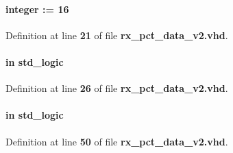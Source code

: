 \paragraph[{ch\+\_\+num}]{ {\bfseries \textcolor{vhdlchar}{ }} {\bfseries \textcolor{comment}{integer}\textcolor{vhdlchar}{ }\textcolor{vhdlchar}{ }\textcolor{vhdlchar}{\+:}\textcolor{vhdlchar}{=}\textcolor{vhdlchar}{ }\textcolor{vhdlchar}{ } \textcolor{vhdldigit}{16} \textcolor{vhdlchar}{ }} \hspace{0.3cm}{\ttfamily [Generic]}}\label{classrx__pct__data__v2_abafab72bb6917998129b758f19755c4c}


Definition at line {\bf 21} of file {\bf rx\+\_\+pct\+\_\+data\+\_\+v2.\+vhd}.

\paragraph[{clk}]{ {\bfseries \textcolor{keywordflow}{in}\textcolor{vhdlchar}{ }} {\bfseries \textcolor{comment}{std\+\_\+logic}\textcolor{vhdlchar}{ }} \hspace{0.3cm}{\ttfamily [Port]}}\label{classrx__pct__data__v2_a4a4609c199d30b3adebbeb3a01276ec5}


Definition at line {\bf 26} of file {\bf rx\+\_\+pct\+\_\+data\+\_\+v2.\+vhd}.

\paragraph[{clr\+\_\+smpl\+\_\+nr}]{ {\bfseries \textcolor{keywordflow}{in}\textcolor{vhdlchar}{ }} {\bfseries \textcolor{comment}{std\+\_\+logic}\textcolor{vhdlchar}{ }} \hspace{0.3cm}{\ttfamily [Port]}}\label{classrx__pct__data__v2_a7dc04539ef5d77088c29f5be14be5a27}


Definition at line {\bf 50} of file {\bf rx\+\_\+pct\+\_\+data\+\_\+v2.\+vhd}.

